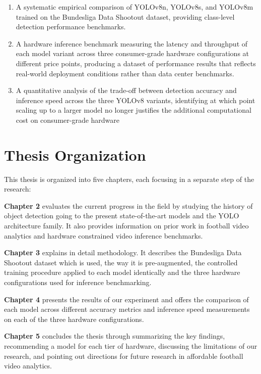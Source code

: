 \begin{enumerate}
    \item A systematic empirical comparison of YOLOv8n, YOLOv8s, and YOLOv8m trained on the Bundesliga Data Shootout dataset, providing class-level detection performance benchmarks.

    \item A hardware inference benchmark measuring the latency and throughput of each model variant across three consumer-grade hardware configurations at different price points, producing a dataset of performance results that reflects real-world deployment conditions rather than data center benchmarks.

    \item A quantitative analysis of the trade-off between detection accuracy and inference speed across the three YOLOv8 variants, identifying at which point scaling up to a larger model no longer justifies the additional computational cost on consumer-grade hardware
\end{enumerate}

\section{Thesis Organization}

This thesis is organized into five chapters, each focusing in a separate step of the research:

\textbf{Chapter 2} evaluates the current progress in the field by studying the history of object detection going to the present state-of-the-art models and the YOLO architecture family. It also provides information on prior work in football video analytics and hardware constrained video inference benchmarks.

\textbf{Chapter 3} explains in detail methodology. It describes the Bundesliga Data Shootout dataset which is used, the way it is pre-augmented, the controlled training procedure applied to each model identically and the three hardware configurations used for inference benchmarking.

\textbf{Chapter 4} presents the results of our experiment and offers the comparison of each model across different accuracy metrics and inference speed measurements on each of the three hardware configurations.

\textbf{Chapter 5} concludes the thesis through summarizing the key findings, recommending a model for each tier of hardware, discussing the limitations of our research, and pointing out directions for future research in affordable football video analytics.